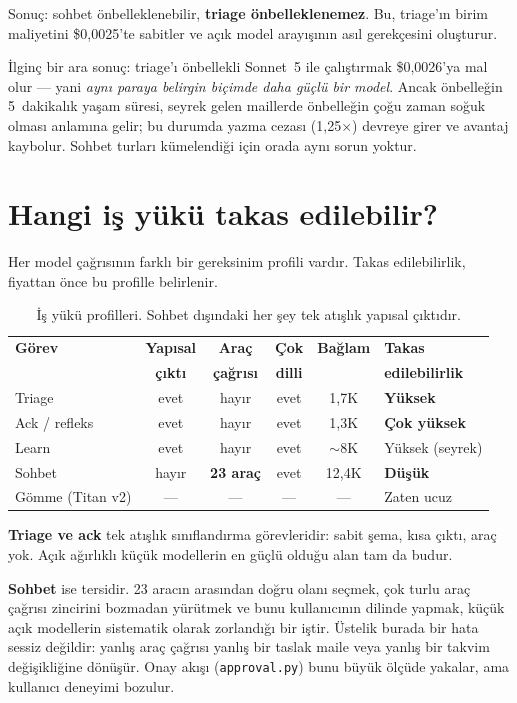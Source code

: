 \documentclass[11pt,a4paper]{article}
\newcommand{\code}[1]{\texttt{\small #1}}
\begin{document}
Sonuç: sohbet önbelleklenebilir, \textbf{triage önbelleklenemez}. Bu, triage'ın birim
maliyetini \$0{,}0025'te sabitler ve açık model arayışının asıl gerekçesini oluşturur.

İlginç bir ara sonuç: triage'ı önbellekli Sonnet~5 ile çalıştırmak \$0{,}0026'ya mal olur
--- yani \emph{aynı paraya belirgin biçimde daha güçlü bir model}. Ancak önbelleğin
5~dakikalık yaşam süresi, seyrek gelen maillerde önbelleğin çoğu zaman soğuk olması
anlamına gelir; bu durumda yazma cezası (1{,}25$\times$) devreye girer ve avantaj kaybolur.
Sohbet turları kümelendiği için orada aynı sorun yoktur.

\section{Hangi iş yükü takas edilebilir?}

Her model çağrısının farklı bir gereksinim profili vardır. Takas edilebilirlik, fiyattan
önce bu profille belirlenir.

\begin{table}[h]
\centering\small
\renewcommand{\arraystretch}{1.25}
\begin{tabular}{@{}lccccl@{}}
\toprule
\textbf{Görev} & \textbf{Yapısal} & \textbf{Araç} & \textbf{Çok} & \textbf{Bağlam} & \textbf{Takas} \\
 & \textbf{çıktı} & \textbf{çağrısı} & \textbf{dilli} & & \textbf{edilebilirlik} \\
\midrule
Triage & evet & hayır & evet & 1{,}7K & \textbf{Yüksek} \\
Ack / refleks & evet & hayır & evet & 1{,}3K & \textbf{Çok yüksek} \\
Learn & evet & hayır & evet & $\sim$8K & Yüksek (seyrek) \\
Sohbet & hayır & \textbf{23 araç} & evet & 12{,}4K & \textbf{Düşük} \\
Gömme (Titan v2) & --- & --- & --- & --- & Zaten ucuz \\
\bottomrule
\end{tabular}
\caption{İş yükü profilleri. Sohbet dışındaki her şey tek atışlık yapısal çıktıdır.}
\end{table}

\textbf{Triage ve ack} tek atışlık sınıflandırma görevleridir: sabit şema, kısa çıktı,
araç yok. Açık ağırlıklı küçük modellerin en güçlü olduğu alan tam da budur.

\textbf{Sohbet} ise tersidir. 23 aracın arasından doğru olanı seçmek, çok turlu araç
çağrısı zincirini bozmadan yürütmek ve bunu kullanıcının dilinde yapmak, küçük açık
modellerin sistematik olarak zorlandığı bir iştir. Üstelik burada bir hata sessiz değildir:
yanlış araç çağrısı yanlış bir taslak maile veya yanlış bir takvim değişikliğine dönüşür.
Onay akışı (\code{approval.py}) bunu büyük ölçüde yakalar, ama kullanıcı deneyimi bozulur.
\end{document}
